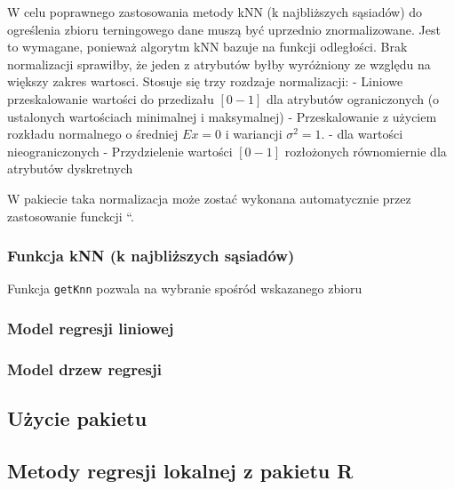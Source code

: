 \documentclass[
]{article}
\begin{document}
W celu poprawnego zastosowania metody kNN (k najbliższych sąsiadów) do
ogreślenia zbioru terningowego dane muszą być uprzednio znormalizowane.
Jest to wymagane, ponieważ algorytm kNN bazuje na funkcji odległości.
Brak normalizacji sprawiłby, że jeden z atrybutów byłby wyróżniony ze
względu na większy zakres wartosci. Stosuje się trzy rozdzaje
normalizacji: - Liniowe przeskalowanie wartości do przedizału \([0-1]\)
dla atrybutów ograniczonych (o ustalonych wartościach minimalnej i
maksymalnej) - Przeskalowanie z użyciem rozkładu normalnego o średniej
\(Ex = 0\) i wariancji \(\sigma^{2} = 1\). - dla wartości
nieograniczonych - Przydzielenie wartości \([0-1]\) rozłożonych
równomiernie dla atrybutów dyskretnych

W pakiecie taka normalizacja może zostać wykonana automatycznie przez
zastosowanie funckcji ``.

\hypertarget{funkcja-knn-k-najbliux17cszych-sux105siaduxf3w}{%
\subsubsection{Funkcja kNN (k najbliższych
sąsiadów)}\label{funkcja-knn-k-najbliux17cszych-sux105siaduxf3w}}

Funkcja \texttt{getKnn} pozwala na wybranie spośród wskazanego zbioru

\hypertarget{model-regresji-liniowej}{%
\subsubsection{Model regresji liniowej}\label{model-regresji-liniowej}}

\hypertarget{model-drzew-regresji}{%
\subsubsection{Model drzew regresji}\label{model-drzew-regresji}}

\hypertarget{uux17cycie-pakietu}{%
\subsection{Użycie pakietu}\label{uux17cycie-pakietu}}

\hypertarget{metody-regresji-lokalnej-z-pakietu-r}{%
\subsection{Metody regresji lokalnej z pakietu
R}\label{metody-regresji-lokalnej-z-pakietu-r}}
\end{document}
